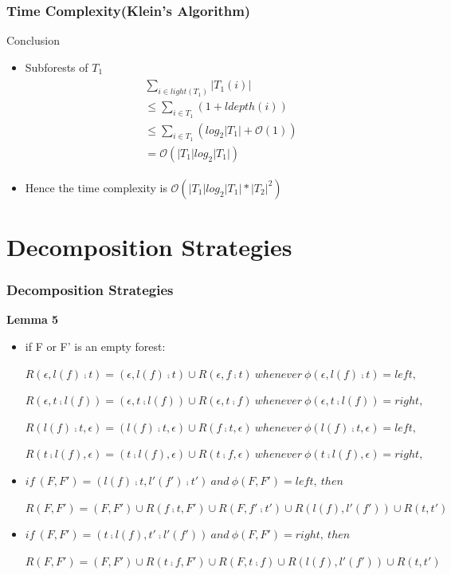 \documentclass{beamer}
\begin{document}
\begin{frame}
\frametitle{Time Complexity(Klein's Algorithm)}
\begin{block}{Conclusion}
\begin{itemize}
\item Subforests of $T_1$
\begin{eqnarray*}
\begin{split}
& \sum_{i \in light(T_1)} \left\vert T_1(i) \right\vert\\
& \leq \sum_{i \in T_1}(1 + ldepth(i))\\ 
& \leq \sum_{i \in T_1}(log_2\left\vert T_1 \right\vert + \mathcal{O}(1))\\
& = \mathcal{O}(\left\vert T_1 \right\vert log_2\left\vert T_1\right\vert)
\end{split}
\end{eqnarray*}
\item Hence the time complexity is $\mathcal{O}(\left\vert T_1 \right\vert log_2\left\vert T_1\right\vert * \left\vert T_2 \right\vert^2)$
\end{itemize}
\end{block}
\end{frame}
\section{Decomposition Strategies}
\begin{frame}
\frametitle{Decomposition Strategies}
\textbf{Lemma 5}
\begin{itemize}
\item if F or F' is an empty forest:

$R(\epsilon , l(f) \comp t) = {(\epsilon, l(f) \comp t)} \cup R(\epsilon, f \comp t)\ whenever\ \phi(\epsilon, l(f) \comp t) = left,$

$R(\epsilon, t \comp l(f)) = {(\epsilon, t \comp l(f))} \cup R(\epsilon, t \comp f)\ whenever\ \phi(\epsilon, t \comp l(f)) = right,$

$R(l(f) \comp t, \epsilon ) = {(l(f) \comp t, \epsilon)} \cup R(f \comp t, \epsilon)\ whenever\ \phi(l(f) \comp t, \epsilon) = left,$

$R(t \comp l(f), \epsilon) = {(t \comp l(f), \epsilon)} \cup R(t \comp f, \epsilon)\ whenever\ \phi(t \comp l(f), \epsilon) = right,$

\item $if\ (F, F') = (l(f) \comp t, l'(f') \comp t')\ and\ \phi(F, F') = left,\ then$

$R(F, F') = {(F, F')} \cup R(f \comp t, F') \cup R(F, f' \comp t') \cup R(l(f), l'(f')) \cup R(t, t')$

\item $if\ (F, F') = (t \comp l(f), t' \comp l'(f'))\ and\ \phi(F, F') = right,\ then$

$R(F, F') = {(F, F')} \cup R(t \comp f, F') \cup R(F, t \comp f) \cup R(l(f), l'(f')) \cup R(t, t')$
\end{itemize}
\end{frame}
\end{document}
